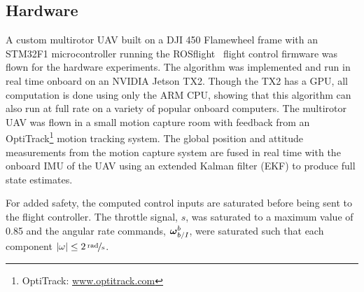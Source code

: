
\subsection{Hardware}

A custom multirotor UAV built on a DJI 450 Flamewheel
frame with an STM32F1 microcontroller running the
ROSflight~\cite{jackson2016rosflight} flight control firmware was flown for the
hardware experiments. The algorithm was
implemented and run in real time onboard on an NVIDIA Jetson
TX2. Though the TX2 has a GPU, all computation is done using only the
ARM CPU, showing that this algorithm can also run at full rate on a variety
of popular onboard computers. The multirotor UAV was flown in a small motion capture room
with feedback from an OptiTrack\footnote{OptiTrack:
\url{www.optitrack.com}}
motion tracking system. The global position and attitude
measurements from the motion capture system are fused in real time with the
onboard IMU of the UAV using an extended Kalman filter (EKF) to produce
full state estimates. 

For added safety, the computed control inputs are saturated before being sent to
the flight controller. The throttle signal, $s$, was saturated to a maximum
value of 0.85 and the angular rate commands, $\boldsymbol{\mathrm{\omega}}_{b/I}^b$, were
saturated such that each component $\left\vert \omega\right\vert \leq 2\,
\nicefrac{\mathrm{rad}}{\mathrm{s}}$.
